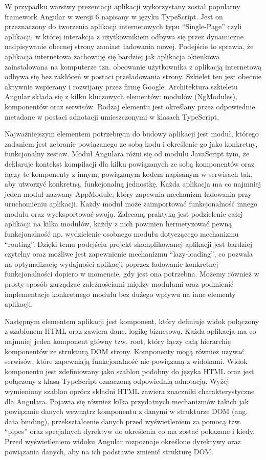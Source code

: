 W przypadku warstwy prezentacji aplikacji wykorzystany został popularny framework Angular w wersji 6 napisany w języku TypeScript. Jest on przeznaczony do tworzenia aplikacji internetowych typu “Single-Page” czyli aplikacji, w której interakcja z użytkownikiem odbywa się przez dynamiczne nadpisywanie obecnej strony zamiast ładowania nowej. Podejście to sprawia, że aplikacja internetowa zachowuję się bardziej jak aplikacja okienkowa zainstalowana na komputerze tzn. obcowanie użytkownika z aplikacją internetową odbywa się bez zakłóceń w postaci przeładowania strony. Szkielet ten jest obecnie aktywnie wspierany i rozwijany przez firmę Google. 
Architektura szkieletu Angular składa się z kilku kluczowych elementów: modułów (NgModules), komponentów oraz serwisów. Rodzaj elementu jest określany przez odpowiednie metadane w postaci adnotacji umieszczonymi w klasach TypeScript.

Najważniejszym elementem potrzebnym do budowy aplikacji jest moduł, którego zadaniem jest zebranie powiązanego ze sobą kodu i określenie go jako konkretny, funkcjonalny zestaw. Moduł Angulara różni się od modułu JavaScript tym, że deklaruje kontekst kompilacji dla kilku powiązanych ze sobą komponentów oraz łączy te komponenty z innym, powiązanym kodem napisanym w serwisach tak, aby utworzyć konkretną, funkcjonalną jednostkę. Każda aplikacja ma co najmniej jeden moduł nazwany \mbox{AppModule}, który zapewnia mechanizm ładowania przy uruchomieniu aplikacji. Każdy moduł może zaimportować funkcjonalność innego modułu oraz wyeksportować swoją. Zalecaną praktyką jest podzielenie całej aplikacji na kilka modułów, każdy z nich powinien hermetyzować pewną funkcjonalność np. wydzielenie osobnego modułu dotyczącego mechanizmu “routing”. Dzięki temu podejściu projekt skomplikowanej aplikacji jest bardziej czytelny oraz możliwe jest zapewnienie mechanizmu “lazy-loading”, co pozwala na optymalizację wydajności aplikacji poprzez ładowanie konkretnej funkcjonalności dopiero w momencie, gdy jest ona potrzebna. Możemy również w prosty sposób zarządzać zależnościami między modułami oraz podmienić implementacje konkretnego modułu bez dużego wpływu na inne elementy aplikacji.


Następnym elementem aplikacji jest komponent, który definiuje widok połączony z szablonem HTML oraz zawiera dane, logikę biznesową. Każda aplikacja ma co najmniej jeden komponent główny tzw. root, który łączy całą hierarchię komponentów ze strukturą DOM strony. Komponenty mogą również używać serwisów, które zapewniają funkcjonalność nie powiązaną z widokami. Widok komponentu jest zdefiniowany jako szablon podobny do języka HTML oraz jest połączony z klasą TypeScript oznaczoną odpowiednią adnotacją. Wyżej wymieniony szablon oprócz składni HTML zawiera znaczniki charakterystyczne dla Angulara. Pojawia się również kilka przydatnych mechanizmów takich jak powiązanie danych wewnątrz komponentu z danymi w strukturze DOM (ang. data binding), przekształcenie danych przed wyświetleniem za pomocą tzw. “pipes” oraz specjalnych dyrektyw do określenia co ma zostać pokazane i kiedy. Przed wyświetleniem widoku Angular rozpoznaje określone dyrektywy oraz powiązania danych, aby na ich podstawie zmienić strukturę DOM.

